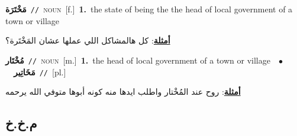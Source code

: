 \documentclass[10pt,a4paper,twoside]{article} %
\begin{document}
\begin{multicols}{2}
{\setlength\topsep{0pt}\textbf{\foreignlanguage{arabic}{مَخْتَرَة}}\ {\color{gray}\texttt{//}\color{black}}\ \textsc{noun}\ [f.]\ \textbf{1.}~the state of being the the head of local government of a town or village\  \begin{flushright}\color{gray}\foreignlanguage{arabic}{\textbf{\underline{\foreignlanguage{arabic}{أمثلة}}}: كل هالمشاكل اللي عملها عشان المَخْتَرة؟}\end{flushright}\color{black}} \vspace{2mm}

{\setlength\topsep{0pt}\textbf{\foreignlanguage{arabic}{مُخْتَار}}\ {\color{gray}\texttt{//}\color{black}}\ \textsc{noun}\ [m.]\ \textbf{1.}~the head of local government of a town or village\ \ $\bullet$\ \ \setlength\topsep{0pt}\textbf{\foreignlanguage{arabic}{مَخَاتِير}}\ {\color{gray}\texttt{//}\color{black}}\ [pl.]\  \begin{flushright}\color{gray}\foreignlanguage{arabic}{\textbf{\underline{\foreignlanguage{arabic}{أمثلة}}}: روح عند المُخْتار واطلب ايدها منه كونه أبوها متوفي الله يرحمه}\end{flushright}\color{black}} \vspace{2mm}

\vspace{-3mm}
\subsection*{\color{blue}\foreignlanguage{arabic}{م.خ.خ}\color{blue}{}} 


\end{multicols}
\end{document}
